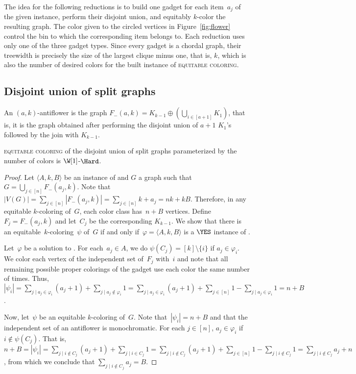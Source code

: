 The idea for the following reductions is to build one gadget for each item~$a_j$ of the given  instance, perform their disjoint union, and equitably $k$-color the resulting graph.
The color given to the circled vertices in Figure~\ref{fig:flower} control the bin to which the corresponding item belongs to.
Each reduction uses only one of the three gadget types.
Since every gadget is a chordal graph, their treewidth is precisely the size of the largest clique minus one, that is, $k$, which is also the number of desired colors for the built instance of \textsc{equitable coloring}.

\subsection{Disjoint union of split graphs}

\begin{definition}
    An $(a,k)$-antiflower is the graph $F_-(a,k) = K_{k-1} \oplus \left(\bigcup_{i \in [a+1]} K_1\right)$, that is, it is the graph obtained after performing the disjoint union of $a+1$ $K_1$'s followed by the join with $K_{k-1}$.
\end{definition}

\begin{theorem}
    \label{thm:dis_split}
    \textsc{equitable coloring} of the disjoint union of split graphs parameterized by the number of colors is $\W[1]$-$\Hard$.
\end{theorem}
\begin{proof}
    Let $\langle A,k,B\rangle$ be an instance of  and $G$ a graph such that~$G = \bigcup_{j \in [n]} F_-(a_j,k)$.
    Note that $|V(G)| = \sum_{j \in [n]} |F_-(a_j, k)| = \sum_{j \in [n]} k + a_j = nk + kB$.
    Therefore, in any equitable $k$-coloring of~$G$, each color class has~$n + B$ vertices.
    Define~$F_j = F_-(a_j,k)$ and let~$C_j$ be the corresponding $K_{k-1}$.
    We show that there is an equitable~$k$-coloring~$\psi$ of~$G$ if and only if~$\varphi = \langle A,k,B\rangle$ is a $\YES$ instance of .
    
    Let~$\varphi$ be a solution to .
    For each~$a_j \in A$, we do $\psi(C_j) = [k] \setminus \{i\}$ if $a_j \in \varphi_i$.
    We color each vertex of the independent set of~$F_{j}$ with~$i$ and note that all remaining possible proper colorings of the gadget use each color the same number of times.
    Thus, $|\psi_i| = \sum_{j \mid a_j \in \varphi_i} (a_j + 1) + \sum_{j \mid a_j \notin \varphi_i} 1 = \sum_{j \mid a_j \in \varphi_i} (a_j + 1) + \sum_{j \in [n]} 1 - \sum_{j \mid a_j \in \varphi_i} 1 = n + B$.
    
    Now, let~$\psi$ be an equitable $k$-coloring of~$G$.
    Note that~$|\psi_i| = n+B$ and that the independent set of an antiflower is monochromatic.
    For each $j \in [n]$, $a_j \in \varphi_i$ if $i \notin \psi(C_j)$.
    That is, $n + B = |\psi_i| = \sum_{j \mid i \notin C_j} (a_j + 1) + \sum_{j \mid i \in C_j} 1 = \sum_{j \mid i \notin C_j} (a_j + 1) + \sum_{j \in [n]} 1 - \sum_{j \mid i \notin C_j} 1 = \sum_{j \mid i \notin C_j} a_j + n$, from which we conclude that $\sum_{j \mid i \notin C_j} a_j = B$.
\end{proof}


